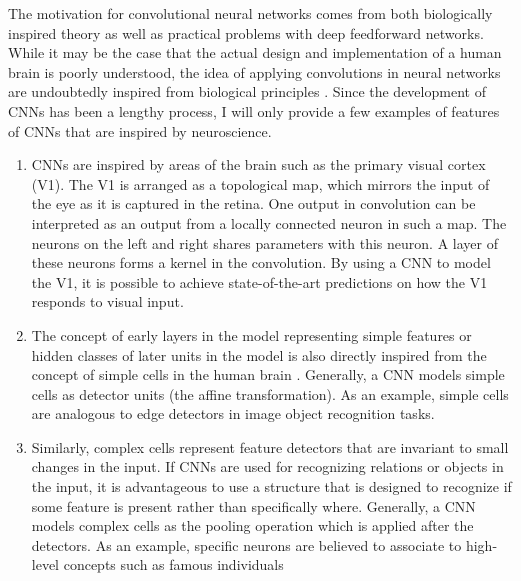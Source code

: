 The motivation for convolutional neural networks comes from both biologically inspired theory as well as practical problems with deep feedforward networks.\\ 

While it may be the case that the actual design and implementation of a human brain is poorly understood, the idea of applying convolutions in neural networks are undoubtedly inspired from biological principles \cite[p.~353]{dlbook}. Since the development of CNNs has been a lengthy process, I will only provide a few examples of features of CNNs that are inspired by neuroscience. \\

\begin{enumerate}

\item CNNs are inspired by areas of the brain such as the primary visual cortex (V1). The V1 is arranged as a topological map, which mirrors the input of the eye as it is captured in the retina. One output in convolution can be interpreted as an output from a locally connected neuron in such a map. The neurons on the left and right shares parameters with this neuron. A layer of these neurons forms a kernel in the convolution. By using a CNN to model the V1, it is possible to achieve state-of-the-art predictions on how the V1 responds to visual input\cite{cnn_sensory_coding}. \\

\item The concept of early layers in the model representing simple features or hidden classes of later units in the model is also directly inspired from the concept of simple cells in the human brain \cite{cnn_taxonomy}. Generally, a CNN models simple cells as detector units (the affine transformation). As an example, simple cells are analogous to edge detectors in image object recognition tasks.\\

\item Similarly, complex cells represent feature detectors that are invariant to small changes in the input. If CNNs are used for recognizing relations or objects in the input, it is advantageous to use a structure that is designed to recognize if some feature is present rather than specifically where. Generally, a CNN models complex cells as the pooling operation which is applied after the detectors. As an example, specific neurons are believed to associate to high-level concepts such as famous individuals \cite{visual_rep_brain}\\
 
\end{enumerate}

